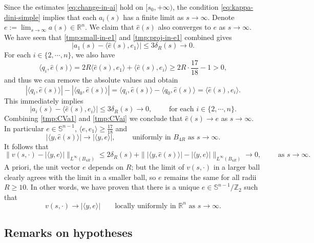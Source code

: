 \documentclass[11pt]{article}
\numberwithin{equation}{section}
\theoremstyle{definition}
\newcommand{\RR}{\mathbb{R}}
\begin{document}
Since the estimates \eqref{eq:change-in-ai} hold on $[s_0, +\infty)$, the condition \eqref{eq:kappa-dini-simple} implies that each $a_i(s)$ has a finite limit as \(s\to\infty\). Denote $e:=\lim_{s\to\infty}a(s) \in \RR^n$.
We claim that $\hat e(s)$ also converges to $e$ as $s\to \infty$.
We have seen that \eqref{tmp:small-in-e1} and \eqref{tmp:proj-in-e1} combined gives 
\begin{equation}\label{tmp:CVa1}
    |a_1(s) - \langle \hat e(s), e_1 \rangle |\leq 3\delta_R(s) \to 0. 
\end{equation} 
For each $i\in \{2, \cdots, n\}$, we also have
\[ \langle q_i, \hat e(s) \rangle = 2R \langle \hat e(s) , e_1 \rangle + \langle \hat e(s), e_i \rangle \geq 2R \cdot \frac{17}{18} - 1 > 0, \]
and thus we can remove the absolute values and obtain
\[ |\langle q_i, \hat e(s) \rangle| - |\langle q_0, \hat e(s) \rangle| = \langle q_i, \hat e(s) \rangle - \langle q_0, \hat e(s) \rangle = \langle \hat e(s), e_i \rangle. \]
This immediately implies
\begin{equation}\label{tmp:CVai}
    |a_i(s) - \langle \hat e(s), e_i \rangle | \leq 3\delta_R(s) \to 0, \qquad \text{ for each } i\in \{2, \cdots, n\}.
\end{equation} 
Combining \eqref{tmp:CVa1} and \eqref{tmp:CVai} we conclude that  $\hat e(s) \to e $ as $s\to \infty$. In particular $e\in \mathbb{S}^{n-1}$, $\langle e, e_1 \rangle \geq \frac{17}{18}$ and
\[ |\langle y, \hat e(s) \rangle | \to | \langle y, e \rangle |, \qquad \text{ uniformly in $B_{4R}$ as } s\to \infty.  \]
It follows that
\[ \|v(s,\cdot) - |\langle y, e \rangle | \|_{L^\infty(B_{4R})} \leq  2\delta_R(s) + \| |\langle y, \hat e(s) \rangle |- |\langle y, e \rangle | \|_{L^\infty(B_{4R})} \longrightarrow 0, \qquad \text{ as } s\to \infty.  \]
A priori, the unit vector $e$ depends on $R$; but the limit of $v(s,\cdot)$ in a larger ball clearly agrees with the limit in a smaller ball, so $e$ remains the same for all radii $R\geq 10$. In other words, we have proven that there is a unique $e\in \mathbb{S}^{n-1}/\mathbb{Z}_2$ such that
\[
    v(s,\cdot)\to |\langle y,e\rangle|
    \qquad\text{locally uniformly in $\RR^n$ as }s\to\infty.
\]

 

\subsection{Remarks on hypotheses}\label{sec:rmk-hp}
\end{document}
